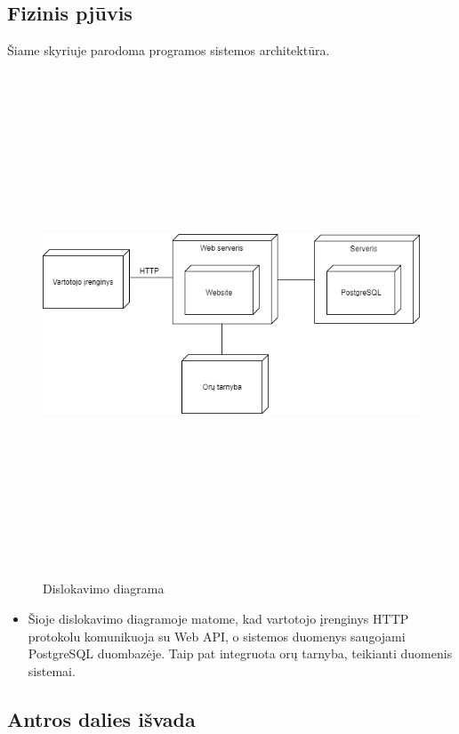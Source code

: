 \documentclass[oneside]{VUMIFPSkursinis}
\begin{document}
\subsection{Fizinis pjūvis}

	Šiame skyriuje parodoma programos sistemos architektūra.
	\newline
	\vskip 0.5cm
\begin{figure}[H]
	\centering	
	\includegraphics[width=15cm,height=15cm,keepaspectratio]{2D0.png}
	\caption{Dislokavimo diagrama}
	\label{fig:Deployment}
\end{figure}
	\begin{itemize}
		\item Šioje dislokavimo diagramoje matome, kad vartotojo įrenginys HTTP protokolu komunikuoja su Web API, o sistemos duomenys saugojami PostgreSQL duombazėje. Taip pat integruota orų tarnyba, teikianti duomenis sistemai.
	\end{itemize}

\pagebreak
\subsection{Antros dalies išvada}
\end{document}
